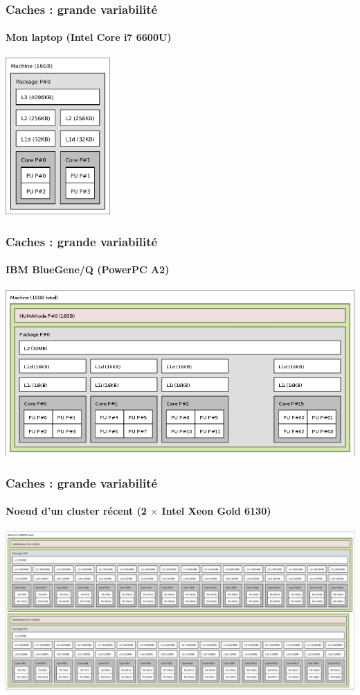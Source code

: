 \documentclass[xcolor={x11names,svgnames}]{beamer}
\begin{document}
\begin{frame}[label=caches]
  \frametitle{Caches : grande variabilité}
  \framesubtitle{Mon laptop  (Intel Core i7 6600U)}
  \centering
  \includegraphics[height=6cm]{lstopo_laptop.pdf}
\end{frame}
  
\begin{frame}[label=caches]
  \frametitle{Caches : grande variabilité}
  \framesubtitle{IBM BlueGene/Q (PowerPC A2)}
  \centering
  \includegraphics[width=\textwidth]{lstopo_bgq.png}
\end{frame}

\begin{frame}[label=caches]
  \frametitle{Caches : grande variabilité}
  \framesubtitle{Noeud d'un cluster récent (2 $\times$ Intel Xeon Gold 6130)}
  \centering
  \includegraphics[width=\textwidth]{lstopo_gr20.pdf}
\end{frame}
\end{document}
